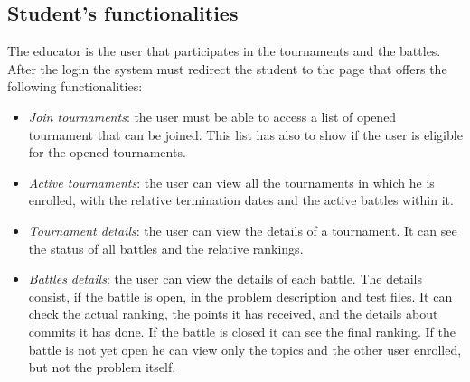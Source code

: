 \documentclass[12pt, a4paper]{report}
\begin{document}
    \subsection{Student's functionalities}
    The educator is the user that participates in the tournaments and the battles. 
    After the login the system must redirect the student to the page that offers the following functionalities: 
    \begin{itemize}
        \item \textit{Join tournaments}: the user must be able to access a list of opened tournament that can be joined. 
            This list has also to show if the user is eligible for the opened tournaments. 
        \item \textit{Active tournaments}: the user can view all the tournaments in which he is enrolled, with the relative termination dates and the active battles within it. 
        \item \textit{Tournament details}: the user can view the details of a tournament. 
            It can see the status of all battles and the relative rankings. 
        \item \textit{Battles details}: the user can view the details of each battle. 
            The details consist, if the battle is open, in the problem description and test files. 
            It can check the actual ranking, the points it has received, and the details about commits it has done. 
            If the battle is closed it can see the final ranking.
            If the battle is not yet open he can view only the topics and the other user enrolled, but not the problem itself. 
    \end{itemize}
\end{document}
